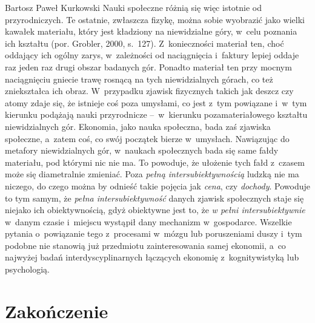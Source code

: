 \begin{artplenv}{Bartosz Paweł Kurkowski}
Nauki społeczne różnią się więc istotnie od przyrodniczych. Te ostatnie, zwłaszcza fizykę, można sobie wyobrazić jako
wielki kawałek materiału, który jest kładziony na niewidzialne góry, w~celu poznania ich kształtu
\label{ref:RNDFerfDjYAQy}(por. Grobler, 2000, s.~127). Z~konieczności materiał ten, choć oddający ich ogólny
zarys, w~zależności od naciągnięcia i~faktury lepiej oddaje raz jeden raz drugi obszar badanych gór. Ponadto materiał ten przy
mocnym naciągnięciu gniecie trawę rosnącą na tych niewidzialnych górach, co też zniekształca ich obraz. W~przypadku
zjawisk fizycznych takich jak deszcz czy atomy zdaje się, że istnieje coś poza umysłami, co jest z~tym
powiązane i~w~tym kierunku podążają nauki przyrodnicze --~w~kierunku pozamateriałowego kształtu niewidzialnych gór. Ekonomia, jako
nauka społeczna, bada zaś zjawiska społeczne, a~zatem coś, co swój początek bierze w~umysłach. Nawiązując do metafory
niewidzialnych gór, w~naukach społecznych bada się same fałdy materiału, pod którymi nic nie ma. To powoduje, że
ułożenie tych fałd z~czasem może się diametralnie zmieniać. Poza \textit{pełną intersubiektywnością} ludzką nie ma
niczego, do czego można by odnieść takie pojęcia jak \textit{cena}, czy \textit{dochody}. Powoduje to tym samym, że
\textit{pełna intersubiektywność} danych zjawisk społecznych staje się niejako ich obiektywnością, gdyż obiektywne jest
to, że \textit{w pełni intersubiektywnie} w~danym czasie i~miejscu wystąpił dany mechanizm w~gospodarce. Wszelkie
pytania o~powiązanie tego z~procesami w~mózgu lub poruszeniami duszy i~tym podobne nie stanowią już przedmiotu
zainteresowania samej ekonomii, a~co najwyżej badań interdyscyplinarnych łączących ekonomię z~kognitywistyką lub
psychologią.

\section*{Zakończenie}


\end{artplenv}
